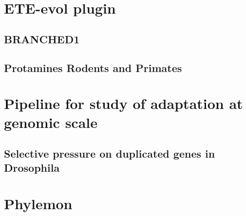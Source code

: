 
\section{ETE-evol plugin}
\subsection{BRANCHED1}
\subsection{Protamines Rodents and Primates}
\section{Pipeline for study of adaptation at genomic scale}
\subsection{Selective pressure on duplicated genes in Drosophila}
\section{Phylemon}

